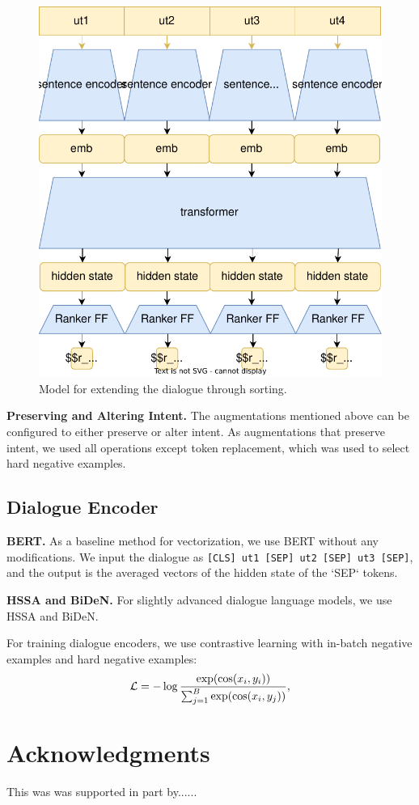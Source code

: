 \documentclass{article}
\begin{document}
\begin{figure}[!htb]
    \centering
    \includegraphics[width=0.7\linewidth]{figures/dialogue-shufflers-listwise.drawio.pdf}
    \caption{Model for extending the dialogue through sorting.}
    \label{fig:listwise}
\end{figure}

\textbf{Preserving and Altering Intent.} The augmentations mentioned above can be configured to either preserve or alter intent. As augmentations that preserve intent, we used all operations except token replacement, which was used to select hard negative examples.

\subsection{Dialogue Encoder}

\textbf{BERT.} As a baseline method for vectorization, we use BERT without any modifications. We input the dialogue as \texttt{[CLS] ut1 [SEP] ut2 [SEP] ut3 [SEP]}, and the output is the averaged vectors of the hidden state of the `SEP` tokens.

\textbf{HSSA and BiDeN.} For slightly advanced dialogue language models, we use HSSA and BiDeN.

For training dialogue encoders, we use contrastive learning with in-batch negative examples and hard negative examples:
$$
\mathcal{L}=-\log{\exp(\cos(x_i,y_i))\over\sum_{j=1}^B\exp(\cos(x_i,y_j))},
$$


\section*{Acknowledgments}
This was was supported in part by......

  
  
\end{document}
